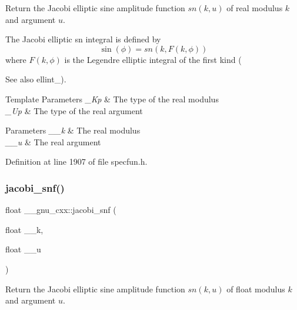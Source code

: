 Return the Jacobi elliptic sine amplitude function $ sn(k,u) $ of real modulus $ k $ and argument $ u $.

The Jacobi elliptic {\ttfamily sn} integral is defined by \[ \sin(\phi) = sn(k, F(k,\phi)) \] where $ F(k,\phi) $ is the Legendre elliptic integral of the first kind (\begin{DoxySeeAlso}{See also}
ellint\+\_).
\end{DoxySeeAlso}

\begin{DoxyTemplParams}{Template Parameters}
{\em \+\_\+\+Kp} & The type of the real modulus \\
\hline
{\em \+\_\+\+Up} & The type of the real argument \\
\hline
\end{DoxyTemplParams}

\begin{DoxyParams}{Parameters}
{\em \+\_\+\+\_\+k} & The real modulus \\
\hline
{\em \+\_\+\+\_\+u} & The real argument \\
\hline
\end{DoxyParams}


Definition at line 1907 of file specfun.\+h.

\mbox{\label{group__gnu__math__spec__func_ga5981245b7343da6e21d445bb01fdba9c}} 
\subsubsection{\texorpdfstring{jacobi\+\_\+snf()}{jacobi\_snf()}}
{\footnotesize\ttfamily float \+\_\+\+\_\+gnu\+\_\+cxx\+::jacobi\+\_\+snf (\begin{DoxyParamCaption}\item[{float}]{\+\_\+\+\_\+k,  }\item[{float}]{\+\_\+\+\_\+u }\end{DoxyParamCaption})\hspace{0.3cm}{\ttfamily [inline]}}

Return the Jacobi elliptic sine amplitude function $ sn(k,u) $ of {\ttfamily float} modulus $ k $ and argument $ u $.

